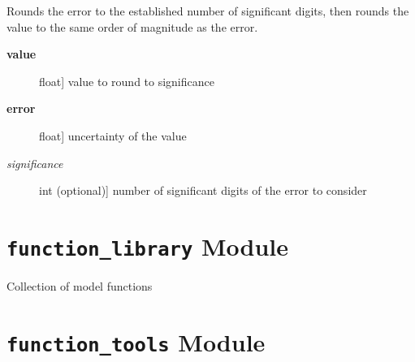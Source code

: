 \documentclass[a4paper,10pt,english]{sphinxmanual}
\begin{document}

\begin{fulllineitems}
\label{index:kafe.fit.round_to_significance}
Rounds the error to the established number of significant digits, then
rounds the value to the same order of magnitude as the error.
\begin{description}
\item[{\textbf{value}}] \leavevmode{[}float{]}
value to round to significance

\item[{\textbf{error}}] \leavevmode{[}float{]}
uncertainty of the value

\item[{\emph{significance}}] \leavevmode{[}int (optional){]}
number of significant digits of the error to consider

\end{description}

\end{fulllineitems}



\section{\texttt{function\_library} Module}
\label{index:module-kafe.function_library}\label{index:function-library-module}\label{index:module-function_library}
Collection of model functions


\section{\texttt{function\_tools} Module}
\label{index:module-kafe.function_tools}\label{index:function-tools-module}\label{index:module-function_tools}
\end{document}
